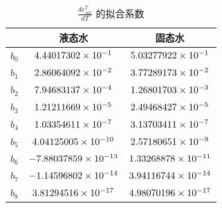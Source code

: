 \begin{table}[htbp]
\centering
\caption{$\frac{d e_{sat}^T}{d T}$ 的拟合系数}
\label{tab:de_sat_dT的拟合系数}
\begin{tabular}{@{}lcc@{}}
\toprule
     &  液态水  & 固态水                         \\ \midrule
$b_0$ & $\rm 4.44017302 \times 10^{-1}$   & $\rm 5.03277922 \times 10^{-1}$  \\
$b_1$ & $\rm 2.86064092 \times 10^{-2}$  & $\rm 3.77289173 \times 10^{-2}$  \\
$b_2$ & $\rm 7.94683137 \times 10^{-4}$   & $\rm 1.26801703 \times 10^{-3}$  \\
$b_3$ & $\rm 1.21211669 \times 10^{-5}$   & $\rm 2.49468427 \times 10^{-5}$  \\
$b_4$ & $\rm 1.03354611 \times 10^{-7}$   & $\rm 3.13703411 \times 10^{-7}$  \\
$b_5$ & $\rm 4.04125005 \times 10^{-10}$  & $\rm 2.57180651 \times 10^{-9}$  \\
$b_6$ & $\rm -7.88037859 \times 10^{-13}$ & $\rm 1.33268878 \times 10^{-11}$ \\
$b_7$ & $\rm -1.14596802 \times 10^{-14}$ & $\rm 3.94116744 \times 10^{-14}$ \\
$b_8$ & $\rm 3.81294516 \times 10^{-17}$  & $\rm 4.98070196 \times 10^{-17}$ \\\bottomrule
\end{tabular}
\end{table}

